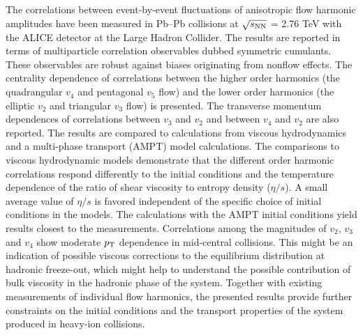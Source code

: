 The correlations between event-by-event fluctuations of anisotropic flow harmonic amplitudes
have been measured in Pb--Pb collisions at $\sqrt{s_{\rm NN}}$ = 2.76 TeV with the ALICE detector at the Large Hadron Collider. 
The results are reported in terms of multiparticle correlation observables dubbed symmetric cumulants.
These observables are robust against biases originating from nonflow effects. 
The centrality dependence of correlations between the higher order harmonics (the quadrangular $v_4$ and pentagonal $v_5$ flow) and the lower order harmonics (the elliptic $v_2$ and triangular $v_3$ flow)
is presented. The transverse momentum dependences of correlations between $v_3$ and $v_2$ and between $v_4$ and $v_2$ are also reported. 
The results are compared to calculations from viscous hydrodynamics and  a multi-phase transport ({AMPT}) model calculations.
The comparisons to viscous hydrodynamic models demonstrate that
the different order harmonic correlations respond differently to the initial conditions and the temperature dependence of the ratio of shear viscosity to entropy density ($\eta/s$). 
A small average value of $\eta/s$ is favored independent of the specific choice of initial conditions in the models. The calculations with the AMPT initial conditions yield results closest to the measurements. 
Correlations among the magnitudes of $v_2$, $v_3$ and $v_4$ show moderate $p_{\rm T}$ dependence in mid-central collisions. This might be an indication of possible viscous corrections to the equilibrium distribution at hadronic freeze-out, which might help to understand the possible contribution of bulk viscosity in the hadronic phase of the system.
Together with existing measurements of individual flow harmonics, the presented results provide further constraints 
on the initial conditions and the transport properties of the system produced in heavy-ion collisions.

